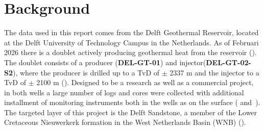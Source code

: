 \chapter{Background} \label{Ch:Background}
The data used in this report comes from the Delft Geothermal Reservoir, located at the Delft University of Technology Campus in the Netherlands. 
As of Februari 2026 there is a doublet actively producing geothermal heat from the reservoir (\cite{beerda2026geothermie}). 
The doublet consists of a producer (\textbf{DEL-GT-01}) and injector(\textbf{DEL-GT-02-S2}), where the producer is drilled up to a TvD of $\pm$ 2337 m and the injector to a TvD of $\pm$ 2100 m (\cite{vardon2024endofwell}). 
Designed to be a research as well as a commercial project, in both wells a large number of logs and cores were collected with additional installment of monitoring instruments both in the wells as on the surface (\cite{vardon2020geothermal} and~\cite{vardon2024endofwell}). 
The targeted layer of this project is the Delft Sandstone, a member of the Lower Cretaceous Nieuwerkerk formation in the West Netherlands Basin (WNB) (\cite{donselaar2015reservoir}).
